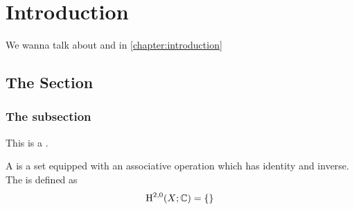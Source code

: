\chapter{Introduction}\label{chapter:introduction}

%
%
We wanna talk about \cite{milnor1963groups} and \cite{milnor1956manifolds} in \autoref{chapter:introduction}

\section{The Section}

\lipsum[1]

\subsection{The subsection}

This is a .

\lipsum[2]

\begin{definition}\label{def:first}
	A  is a set equipped with an associative operation which has identity and inverse. The  is defined as
	\[
		\operatorname{H}^{2,0}(X; \mathbb{C}) = \{\}
	\]
\end{definition}

